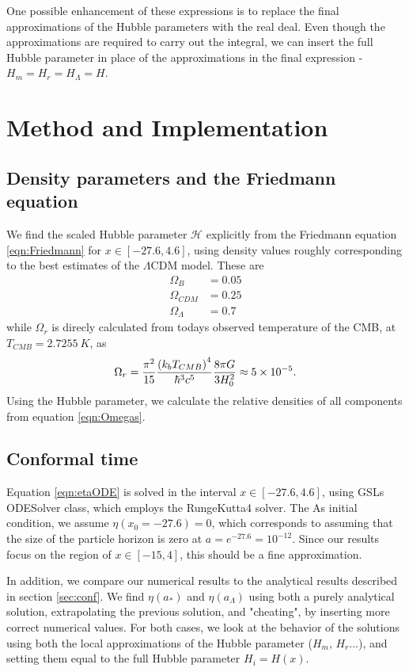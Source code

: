 \documentclass[10pt, a4paper]{article}
\begin{document}
One possible enhancement of these expressions is to replace the final approximations of the Hubble parameters with the real deal. Even though the approximations are required to carry out the integral, we can insert the full Hubble parameter in place of the approximations in the final expression - $H_m = H_r = H_{\Lambda} = H$.


\section{Method and Implementation}
\subsection{Density parameters and the Friedmann equation}
We find the scaled Hubble parameter $\mathcal{H}$ explicitly from the Friedmann equation \ref{eqn:Friedmann} for $x \in [-27.6, 4.6]$, using density values roughly corresponding to the best estimates of the $\Lambda$CDM model. These are
\begin{align*}
    \Omega_B &= 0.05 \\
    \Omega_{CDM} &= 0.25 \\
    \Omega_{\Lambda} &= 0.7
\end{align*}
while $\Omega_r$ is direcly calculated from todays observed temperature of the CMB, at $T_{CMB} = \SI{2.7255}{K}$, as
\begin{align*}
    \Omega_r = \frac{\pi^2}{15}\frac{\qty(k_bT_{CMB})^4}{\hbar^3c^5}\frac{8\pi G}{3H_0^2} \approx 5\times 10^{-5}.
\end{align*}
Using the Hubble parameter, we calculate the relative densities of all components from equation \ref{eqn:Omegas}.


\subsection{Conformal time}
Equation \ref{eqn:etaODE} is solved in the interval $x \in [-27.6, 4.6]$, using GSLs ODESolver class, which employs the RungeKutta4 solver. The  As initial condition, we assume $\eta(x_0 = -27.6) = 0$, which corresponds to assuming that the size of the particle horizon is zero at $a=e^{-27.6} = 10^{-12}$. Since our results focus on the region of $x \in [-15, 4]$, this should be a fine approximation.

In addition, we compare our numerical results to the analytical results described in section \ref{sec:conf}. We find $\eta(a_*)$ and $\eta(a_\Lambda)$ using both a purely analytical solution, extrapolating the previous solution, and "cheating", by inserting more correct numerical values. For both cases, we look at the behavior of the solutions using both the local approximations of the Hubble parameter ($H_m$, $H_r$...), and setting them equal to the full Hubble parameter $H_i = H(x)$.
\end{document}

